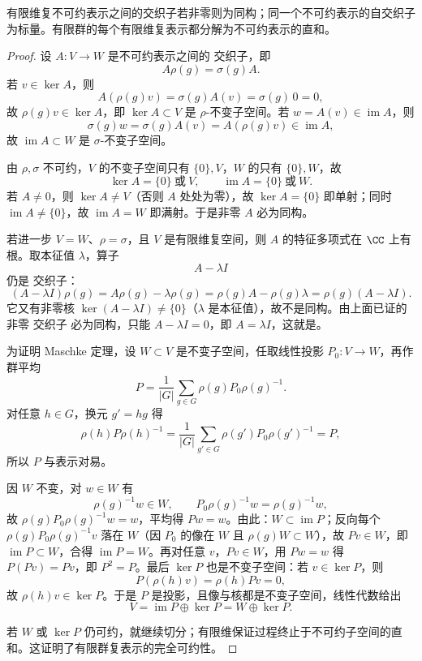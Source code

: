 \begin{theorem}
有限维复不可约表示之间的交织子若非零则为同构；同一个不可约表示的自交织子为标量。有限群的每个有限维复表示都分解为不可约表示的直和。
\end{theorem}
\begin{proof}
设 $A:V\to W$ 是不可约表示之间的 交织子，即
\[
A\rho(g)=\sigma(g)A.
\]
若 $v\in\ker A$，则
\begin{equation*}
  A(\rho(g)v)=\sigma(g)A(v)=\sigma(g)\,0=0,
\end{equation*}
故 $\rho(g)v\in\ker A$，即 $\ker A\subset V$ 是 $\rho$-不变子空间。若 $w=A(v)\in\operatorname{im}A$，则
\begin{equation*}
  \sigma(g)w=\sigma(g)A(v)=A(\rho(g)v)\in\operatorname{im}A,
\end{equation*}
故 $\operatorname{im}A\subset W$ 是 $\sigma$-不变子空间。

由 $\rho,\sigma$ 不可约，$V$ 的不变子空间只有 $\{0\},V$，$W$ 的只有 $\{0\},W$，故
\[
\ker A=\{0\}\ \text{或}\ V,
\qquad
\operatorname{im}A=\{0\}\ \text{或}\ W.
\]
若 $A\neq0$，则 $\ker A\neq V$（否则 $A$ 处处为零），故 $\ker A=\{0\}$ 即单射；同时 $\operatorname{im}A\neq\{0\}$，故 $\operatorname{im}A=W$ 即满射。于是非零 $A$ 必为同构。

若进一步 $V=W$、$\rho=\sigma$，且 $V$ 是有限维复空间，则 $A$ 的特征多项式在 $\CC$ 上有根。取本征值 $\lambda$，算子
\[
A-\lambda I
\]
仍是 交织子：
\begin{equation*}
  (A-\lambda I)\rho(g)
  =A\rho(g)-\lambda\rho(g)
  =\rho(g)A-\rho(g)\lambda
  =\rho(g)(A-\lambda I).
\end{equation*}
它又有非零核 $\ker(A-\lambda I)\neq\{0\}$（$\lambda$ 是本征值），故不是同构。由上面已证的非零 交织子 必为同构，只能 $A-\lambda I=0$，即 $A=\lambda I$，这就是。

为证明 Maschke 定理，设 $W\subset V$ 是不变子空间，任取线性投影 $P_0:V\to W$，再作群平均
\[
P=\frac1{|G|}\sum_{g\in G}
\rho(g)P_0\rho(g)^{-1}.
\]
对任意 $h\in G$，换元 $g'=hg$ 得
\[
\rho(h)P\rho(h)^{-1}
=\frac1{|G|}\sum_{g'\in G}
\rho(g')P_0\rho(g')^{-1}
=P,
\]
所以 $P$ 与表示对易。

因 $W$ 不变，对 $w\in W$ 有
\[
\rho(g)^{-1}w\in W,
\qquad
P_0\rho(g)^{-1}w=\rho(g)^{-1}w,
\]
故 $\rho(g)P_0\rho(g)^{-1}w=w$，平均得 $Pw=w$。由此：$W\subset\operatorname{im}P$；反向每个 $\rho(g)P_0\rho(g)^{-1}v$ 落在 $W$（因 $P_0$ 的像在 $W$ 且 $\rho(g)W\subset W$），故 $P v\in W$，即 $\operatorname{im}P\subset W$，合得 $\operatorname{im}P=W$。再对任意 $v$，$P v\in W$，用 $Pw=w$ 得 $P(P v)=P v$，即 $P^2=P$。最后 $\ker P$ 也是不变子空间：若 $v\in\ker P$，则
\begin{equation*}
  P(\rho(h)v)=\rho(h)P v=0,
\end{equation*}
故 $\rho(h)v\in\ker P$。于是 $P$ 是投影，且像与核都是不变子空间，线性代数给出
\[
V=\operatorname{im}P\oplus\ker P=W\oplus\ker P.
\]

若 $W$ 或 $\ker P$ 仍可约，就继续切分；有限维保证过程终止于不可约子空间的直和。这证明了有限群复表示的完全可约性。
\end{proof}


